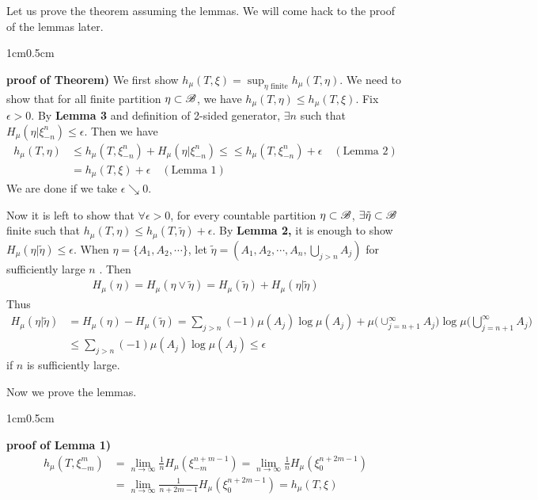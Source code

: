 \documentclass[10pt,a4paper]{report}
\newenvironment{proof}
{\begin{changemargin}{1cm}{0.5cm} 
	}%
	{\end{changemargin}
}
\begin{document}
Let us prove the theorem assuming the lemmas. We will come hack to the proof of the lemmas later.
\s

\begin{proof}
\textbf{proof of Theorem)} We first show $h_{\mu} (T,\xi) = \sup_{\eta \text{ finite}} h_{\mu} (T,\eta)$. We need to show that for all finite partition $\eta \subset \mathscr{B}$, we have $h_{\mu}(T,\eta) \leq h_{\mu}(T,\xi)$. Fix $\epsilon>0$. By \textbf{Lemma 3} and definition of 2-sided generator, $\exists n$ such that $H_{\mu}(\eta | \xi^n_{-n}) \leq \epsilon$. Then we have
\begin{align*}
h_{\mu}(T,\eta) & \leq h_{\mu}(T,\xi_{-n}^n) + H_{\mu}(\eta | \xi^n_{-n}) \leq \leq h_{\mu}(T,\xi_{-n}^n) + \epsilon \quad (\text{Lemma 2}) \\
& = h_{\mu} (T,\xi) + \epsilon \quad (\text{Lemma 1})
\end{align*}
We are done if we take $\epsilon \searrow 0$.
\s

Now it is left to show that $\forall \epsilon >0$, for every countable partition $\eta \subset \mathscr{B}$, $\exists \tilde{\eta} \subset \mathscr{B}$ finite such that $h_{\mu}(T,\eta) \leq h_{\mu}(T, \tilde{\eta}) + \epsilon$. By \textbf{Lemma 2,} it is enough to show $H_{\mu}(\eta |\tilde{\eta}) \leq \epsilon$. When $\eta = \{A_1, A_2, \cdots \}$, let $\tilde{\eta} = (A_1, A_2, \cdots, A_n, \bigcup_{j>n} A_j)$ for sufficiently large $n$ . Then
\begin{align*}
H_{\mu}(\eta) = H_{\mu} (\eta \vee \tilde{\eta}) = H_{\mu}(\tilde{\eta}) + H_{\mu}(\eta |\tilde{\eta})
\end{align*}
Thus
\begin{align*}
H_{\mu}(\eta | \tilde{\eta}) &= H_{\mu}(\eta) - H_{\mu}(\tilde{\eta}) = \sum_{j>n} (-1) \mu(A_j) \log \mu(A_j) + \mu \Big( \cup_{j=n+1}^{\infty} A_j \Big) \log \mu \Big( \bigcup_{j=n+1}^{\infty} A_j \Big) \\
& \leq \sum_{j>n} (-1) \mu(A_j) \log \mu(A_j) \leq \epsilon
\end{align*}
if $n$ is sufficiently large.

\eop
\end{proof}
\s

Now we prove the lemmas.
\s

\begin{proof}
\textbf{proof of Lemma 1)} \begin{align*}
h_{\mu}(T, \xi_{-m}^m) &= \lim_{n\rightarrow \infty} \frac{1}{n} H_{\mu}(\xi^{n+m-1}_{-m}) = \lim_{n\rightarrow \infty} \frac{1}{n} H_{\mu} (\xi_0^{n+2m -1}) \\
&= \lim_{n\rightarrow \infty} \frac{1}{n+2m-1} H_{\mu}(\xi_0^{n+2m-1}) = h_{\mu}(T,\xi)
\end{align*}

\eop
\end{proof}
\s
\end{document}
